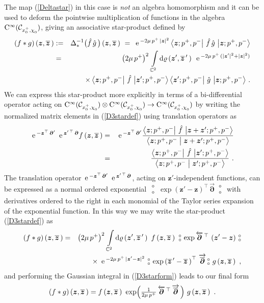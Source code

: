 \documentclass[11pt,a4paper]{article}
\newcommand{\NO}{\mbox{$\substack{\circ\\\circ}$}}      %
\newcommand{\mbf}[1]{{\boldsymbol {#1} }}
\def\dd{{\rm d}}
\def\mz{{\mbf z}}
\def\mdell{{\mbf\partial}}
\newcommand{\complex}{{\mathbb C}} %
\def\e{{\,\rm e}\,}
\def\bea{\begin{eqnarray}}
\def\eea{\end{eqnarray}}
\newcommand{\beq}{\begin{eqnarray}}
\newcommand{\eeq}{\end{eqnarray}}
\begin{document}
The map (\ref{Deltastar}) in this case is {\it not} an algebra homomorphism
and it can be used to deform the pointwise multiplication of functions
in the algebra ${\rm C}^\infty(\mathcal{C}_{x_0^+,\chi^{~}_0})$, giving
an associative star-product defined by
\bea
(f*g)\left(\mz,\overline{\mz}\,\right)&:=&
\Delta_*^{-1}\bigl(\hat f\,\hat g\,\bigr)
\left(\mz,\overline{\mz}\,\right)~=~\e^{-2\mu\,p^+\,|\mz|^2}\,
\bigl\langle\mz;p^+,p^-\bigl|~\hat f\,\hat g~\bigr|\mz;p^+,p^-
\bigr\rangle\nonumber\\ &=&\left(2\mu\,p^+\right)^2\,
\int\limits_{\complex^2}\dd\varrho\left(\mz',\overline{\mz}{}^{\,\prime}\,
\right)~\e^{-2\mu\,p^+\,(|\mz'|^2+|\mz|^2)}\nonumber\\
&&\times\,\bigl\langle\mz;p^+,p^-
\bigl|~\hat f~\bigr|\mz';p^+,p^-\bigr\rangle\,\bigl\langle
\mz';p^+,p^-\bigl|~\hat g~\bigr|\mz;p^+,p^-\bigr\rangle \ .
\label{D3stardef}\eea
We can express this star-product more explicitly in terms of a
bi-differential operator acting on ${\rm
  C}^\infty(\mathcal{C}_{x_0^+,\chi^{~}_0})\otimes{\rm
  C}^\infty(\mathcal{C}_{x_0^+,\chi^{~}_0})\to{\rm
  C}^\infty(\mathcal{C}_{x_0^+,\chi^{~}_0})$ by writing the normalized
matrix elements in (\ref{D3stardef}) using translation operators
as~\cite{APS1}
\bea
\e^{-\mz^\top\,\mdell'}~\e^{\mz^{\prime\,\top}\,\mdell}
f\left(\mz,\overline{\mz}\,\right)&=&\e^{-\mz^\top\,\mdell'}
\frac{\bigl\langle\mz;p^+,p^-
\bigl|~\hat f~\bigr|\mz+\mz';p^+,p^-\bigr\rangle}{
\bigl\langle\mz;p^+,p^-\bigm|\mz+\mz';p^+,p^-\bigr\rangle}\nonumber\\ &=&
\frac{\bigl\langle\mz;p^+,p^-
\bigl|~\hat f~\bigr|\mz';p^+,p^-\bigr\rangle}{
\bigl\langle\mz;p^+,p^-\bigm|\mz';p^+,p^-\bigr\rangle} \ .
\label{matrixelttransl}\eea
The translation operator
$\e^{-\mz^\top\,\mdell'}~\e^{\mz^{\prime\,\top}\,\mdell}$, acting on
$\mz'$-independent functions, can be expressed as a normal ordered
exponential $\NO\,\exp(\mz'-\mz)^\top\,\overrightarrow{\mdell}\,\NO$
with derivatives ordered to the right in each monomial of the Taylor
series expansion of the exponential function. In this way we may write
the star-product (\ref{D3stardef}) as
\bea
(f*g)\left(\mz,\overline{\mz}\,\right)&=&\left(2\mu\,p^+\right)^2\,
\int\limits_{\complex^2}\dd\varrho\left(\mz',\overline{\mz}{}^{\,\prime}\,
\right)~f\left(\mz,\overline{\mz}\,\right)~\NO\,\exp
\overleftarrow{\mdell}{}^{\,\top}\,\left(\mz'-\mz\right)\,\NO\nonumber\\
&&\times~\e^{-2\mu\,p^+\,|\mz'-\mz|^2}~\NO\,\exp\left(
\overline{\mz}{}^{\,\prime}-\overline{\mz}\,\right)^\top\,
\overrightarrow{\overline{\mdell}}\,\NO~g\left(\mz,\overline{\mz}\,\right) \ ,
\label{D3starform}\eea
and performing the Gaussian integral in (\ref{D3starform}) leads
to our final form
\beq
(f*g)\left(\mz,\overline{\mz}\,\right)=f\left(\mz,
\overline{\mz}\,\right)~\exp\Bigl(\mbox{$\frac1{2\mu\,p^+}$}\,
\overleftarrow{\mdell}{}^{\,\top}\,\overrightarrow{\overline{\mdell}}
\,\Bigr)~g\left(\mz,\overline{\mz}\,\right) \ .
\label{D3starfinal}\eeq
\end{document}
